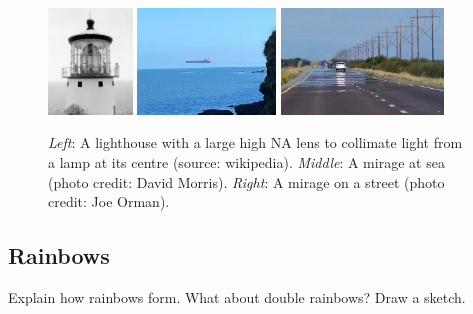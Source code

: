 \documentclass[a4paper]{report}
\begin{document}
	\begin{figure}[h]
		\center
		\includegraphics[width=0.2\textwidth]{figures/lighthouse.png}
		\includegraphics[width=0.327\textwidth]{figures/superior_mirage.png}
		\includegraphics[width=0.385\textwidth]{figures/mirage.png}
		\captionsetup{width=0.93\textwidth}
		\caption{\emph{Left}: A lighthouse with a large high NA lens to collimate light from a lamp at its centre (source: wikipedia).
		\emph{Middle}: A mirage at sea (photo credit: David Morris).
		\emph{Right}: A mirage on a street (photo credit: Joe Orman).}
		\label{fig:lighthouse_mirage}
	\end{figure}


    \subsection{Rainbows}
    Explain how rainbows form. What about double rainbows? Draw a sketch.
\end{document}
